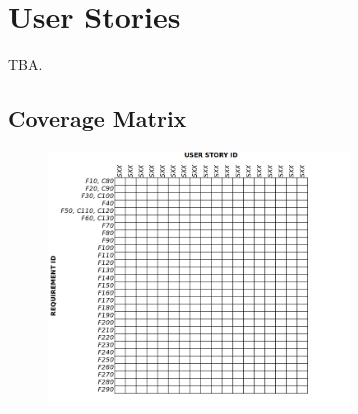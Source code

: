 \documentclass[a4paper,10pt]{article}
\begin{document}
\newpage
\section{User Stories}

TBA.


\newpage
\subsection{Coverage Matrix}

\begin{figure}[h]
\includegraphics[width=8cm]{coverage_matrix}
\centering
\end{figure}
\end{document}
